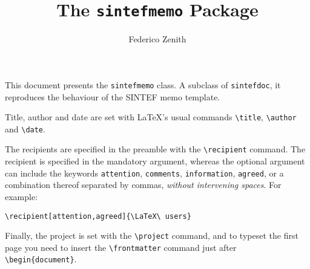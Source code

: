 \documentclass[unrestricted]{sintefmemo}
\title{The \texttt{sintefmemo} Package}
\author{Federico Zenith}
\begin{document}
\frontmatter

This document presents the \texttt{sintefmemo} class.
A subclass of \texttt{sintefdoc}, it reproduces the behaviour of
the SINTEF memo template.

Title, author and date are set with \LaTeX's usual commands
\verb|\title|, \verb|\author| and \verb|\date|.

The recipients are specified in the preamble with the \verb|\recipient|
command.
The recipient is specified in the mandatory argument, whereas the optional
argument can include the keywords \verb|attention|, \verb|comments|,
\verb|information|, \verb|agreed|, or a combination thereof separated by
commas, \emph{without intervening spaces}. For example:
\begin{verbatim}
\recipient[attention,agreed]{\LaTeX\ users}
\end{verbatim}

Finally, the project is set with the \verb|\project| command, and
to typeset the first page you need to insert the \verb|\frontmatter|
command just after \verb|\begin{document}|.
\end{document}
